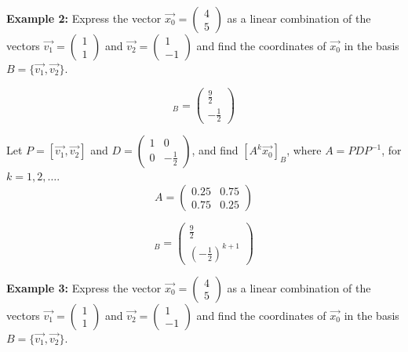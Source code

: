 \noindent
\newline
\textbf{Example 2:} Express the vector \(\Vec{x_0}=\begin{pmatrix}
    4 \\ 5
\end{pmatrix}\) as a linear combination of the vectors \(\Vec{v_1}=\begin{pmatrix}
    1 \\ 1
\end{pmatrix}\) and \(\Vec{v_2}= \begin{pmatrix}
    1 \\ -1
\end{pmatrix}\) and find the coordinates of \(\Vec{x_0}\) in the basis \(B=\{\Vec{v_1},\Vec{v_2}\}\).

\begin{equation}
    [\Vec{x_0}]_B = \begin{pmatrix}
        \frac{9}{2} \\ -\frac{1}{2}
    \end{pmatrix}
\end{equation}

\noindent
Let \(P=[\Vec{v_1}, \Vec{v_2}]\) and \(D=\begin{pmatrix}
    1 & 0 \\ 0 & -\frac{1}{2}
\end{pmatrix}\), and find \([A^k\Vec{x_0}]_B\), where \(A=PDP^{-1}\), for \(k=1,2,\dots\).
\begin{equation}
    A = \begin{pmatrix}
        0.25 & 0.75 \\ 0.75 & 0.25
    \end{pmatrix}
\end{equation}

\begin{equation}
    [A^k\Vec{x_0}]_B = \begin{pmatrix}
        \frac{9}{2} \\ (-\frac{1}{2})^{k+1}
    \end{pmatrix}
\end{equation}

\noindent
\newline
\textbf{Example 3:} Express the vector \(\Vec{x_0}=\begin{pmatrix}
    4 \\ 5
\end{pmatrix}\) as a linear combination of the vectors \(\Vec{v_1}=\begin{pmatrix}
    1 \\ 1
\end{pmatrix}\) and \(\Vec{v_2}= \begin{pmatrix}
    1 \\ -1
\end{pmatrix}\) and find the coordinates of \(\Vec{x_0}\) in the basis \(B=\{\Vec{v_1},\Vec{v_2}\}\).

